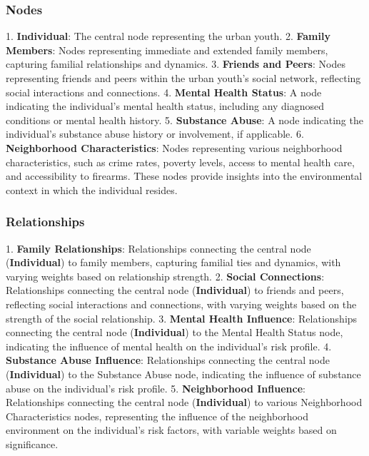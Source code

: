 \documentclass[11pt]{article}
\begin{document}
\subsubsection*{Nodes}

1. \textbf{Individual}: The central node representing the urban youth.
2. \textbf{Family Members}: Nodes representing immediate and extended family members, capturing familial relationships and dynamics.
3. \textbf{Friends and Peers}: Nodes representing friends and peers within the urban youth's social network, reflecting social interactions and connections.
4. \textbf{Mental Health Status}: A node indicating the individual's mental health status, including any diagnosed conditions or mental health history.
5. \textbf{Substance Abuse}: A node indicating the individual's substance abuse history or involvement, if applicable.
6. \textbf{Neighborhood Characteristics}: Nodes representing various neighborhood characteristics, such as crime rates, poverty levels, access to mental health care, and accessibility to firearms. These nodes provide insights into the environmental context in which the individual resides.

\subsubsection*{Relationships}

1. \textbf{Family Relationships}: Relationships connecting the central node (\textbf{Individual}) to family members, capturing familial ties and dynamics, with varying weights based on relationship strength.
2. \textbf{Social Connections}: Relationships connecting the central node (\textbf{Individual}) to friends and peers, reflecting social interactions and connections, with varying weights based on the strength of the social relationship.
3. \textbf{Mental Health Influence}: Relationships connecting the central node (\textbf{Individual}) to the Mental Health Status node, indicating the influence of mental health on the individual's risk profile.
4. \textbf{Substance Abuse Influence}: Relationships connecting the central node (\textbf{Individual}) to the Substance Abuse node, indicating the influence of substance abuse on the individual's risk profile.
5. \textbf{Neighborhood Influence}: Relationships connecting the central node (\textbf{Individual}) to various Neighborhood Characteristics nodes, representing the influence of the neighborhood environment on the individual's risk factors, with variable weights based on significance.
\end{document}
